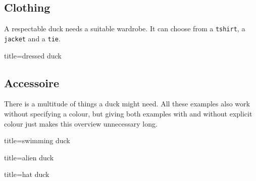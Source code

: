 \documentclass{ltxdockit}
\begin{document}
\newpage
\subsection{Clothing}

A respectable duck needs a suitable wardrobe. It can choose from a \texttt{tshirt}, a \texttt{jacket} and a \texttt{tie}.

\begin{tcblisting}{title={dressed duck}}
\begin{tikzpicture}
	\duck[tshirt]
\end{tikzpicture}
\begin{tikzpicture}
	\duck[jacket]
\end{tikzpicture}

\begin{tikzpicture}
	\duck[tie]
\end{tikzpicture}
\begin{tikzpicture}
	\duck[tshirt=lightgray, 
			jacket=blue!50!black, 
			tie=blue!80!black, 
			shorthair]
\end{tikzpicture}
\end{tcblisting}

\subsection{Accessoire}

There is a multitude of things a duck might need. All these examples also work without specifying a colour, but giving both examples with and without explicit colour just makes this overview unnecessary long.

\begin{tcblisting}{title={swimming duck}}
\begin{tikzpicture}
	\duck[water=cyan!50!blue]
\end{tikzpicture}
\end{tcblisting}

\begin{tcblisting}{title={alien duck}}
\begin{tikzpicture}
	\duck[alien=green!50!brown]
\end{tikzpicture}
\end{tcblisting}

\begin{tcblisting}{title={hat duck}}
\begin{tikzpicture}
	\duck[hat=red!50!black]
\end{tikzpicture}
\end{tcblisting}
\end{document}
